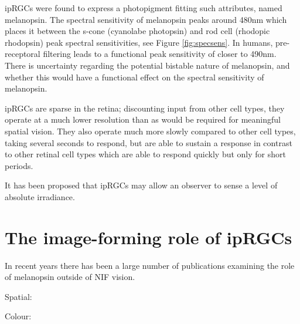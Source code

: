\Glspl{ipRGC} were found to express a photopigment fitting such attributes, named melanopsin. The spectral sensitivity of melanopsin peaks around 480nm\citep{qiu_induction_2005,hankins_primary_2002,dacey_melanopsin-expressing_2005,peirson_melanopsin_2006,bailes_human_2013} which places it between the s-cone (cyanolabe photopsin) and rod cell (rhodopic rhodopsin) peak spectral sensitivities, see Figure \ref{fig:specsens}. In humans, pre-receptoral filtering leads to a functional peak sensitivity of closer to 490nm\citep{cie_cie_2015-1}. There is uncertainty regarding the potential bistable nature of melanopsin, and whether this would have a functional effect on the spectral sensitivity of melanopsin\citep{cie_cie_2015-1,mure_melanopsin_2009,rollag_does_2008}.

\Glspl{ipRGC} are sparse in the retina; discounting input from other cell types, they operate at a much lower resolution than as would be required for meaningful spatial vision. They also operate much more slowly compared to other cell types, taking several seconds to respond, but are able to sustain a response in contrast to other retinal cell types which are able to respond quickly but only for short periods.

It has been proposed that \glspl{ipRGC} may allow an observer to sense a level of absolute irradiance\citep{brown_melanopsin_2010}. 

\section{The image-forming role of ipRGCs}

In recent years there has been a large number of publications examining the role of melanopsin outside of \gls{NIF} vision.

Spatial:
\cite{ecker_melanopsin-expressing_2010}
\cite{spitschan_vision_2017}
\cite{mouland_responses_2017}
\cite{allen_melanopsin_2017}
\cite{allen_form_2019}

Colour:
\cite{cao_evidence_2018}
\cite{spitschan_human_2017-1}
\cite{zele_melanopsin_2018}